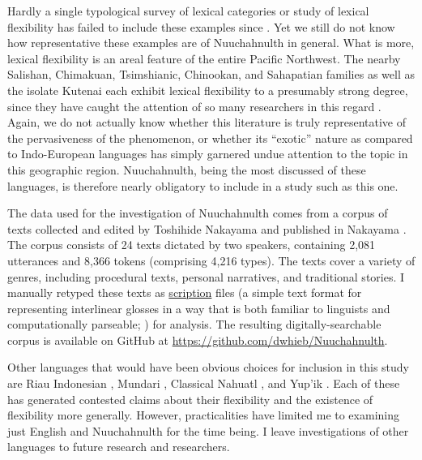 
Hardly a single typological survey of lexical categories or study of lexical flexibility has failed to include these examples since . Yet we still do not know how representative these examples are of Nuuchahnulth in general. What is more, lexical flexibility is an areal feature of the entire Pacific Northwest. The nearby Salishan, Chimakuan, Tsimshianic, Chinookan, and Sahapatian families as well as the isolate Kutenai each exhibit lexical flexibility to a presumably strong degree, since they have caught the attention of so many researchers in this regard . Again, we do not actually know whether this literature is truly representative of the pervasiveness of the phenomenon, or whether its \enquote{exotic} nature as compared to Indo-European languages has simply garnered undue attention to the topic in this geographic region. Nuuchahnulth, being the most discussed of these languages, is therefore nearly obligatory to include in a study such as this one.

The data used for the investigation of Nuuchahnulth comes from a corpus of texts collected and edited by Toshihide Nakayama and published in Nakayama . The corpus consists of 24 texts dictated by two speakers, containing 2,081 utterances and 8,366 tokens (comprising 4,216 types). The texts cover a variety of genres, including procedural texts, personal narratives, and traditional stories. I manually retyped these texts as \href{https://scription.digitallinguistics.io}{scription} files (a simple text format for representing interlinear glosses in a way that is both familiar to linguists and computationally parseable; ) for analysis. The resulting digitally-searchable corpus is available on GitHub at \url{https://github.com/dwhieb/Nuuchahnulth}.

Other languages that would have been obvious choices for inclusion in this study are Riau Indonesian , Mundari , Classical Nahuatl , and Yup'ik . Each of these has generated contested claims about their flexibility and the existence of flexibility more generally. However, practicalities have limited me to examining just English and Nuuchahnulth for the time being. I leave investigations of other languages to future research and researchers.

